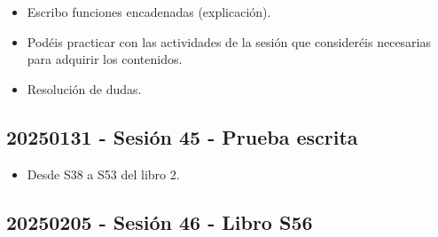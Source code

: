 \documentclass[a4paper,12pt]{article}
\begin{document}
\begin{itemize}
    \item Escribo funciones encadenadas (explicación).
    \item Podéis practicar con las actividades de la sesión que consideréis necesarias para adquirir los contenidos.
    \item Resolución de dudas.
\end{itemize}

\subsection{20250131 - Sesión 45 - Prueba escrita}

\begin{itemize}
    \item Desde S38 a S53 del libro 2.
\end{itemize}

\subsection{20250205 - Sesión 46 - Libro S56}
\end{document}
